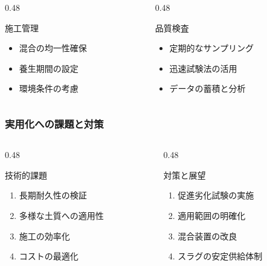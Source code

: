 \documentclass[unicode, 9pt, aspectratio=43]{beamer}
\begin{document}
\begin{refsection}
\begin{frame}
    \begin{columns}
      \begin{column}{0.48\linewidth}
        \begin{alertblock}{施工管理}
          \begin{itemize}
            \item 混合の均一性確保
            \item 養生期間の設定
            \item 環境条件の考慮
          \end{itemize}
        \end{alertblock}
      \end{column}
      \begin{column}{0.48\linewidth}
        \begin{exampleblock}{品質検査}
          \begin{itemize}
            \item 定期的なサンプリング
            \item 迅速試験法の活用
            \item データの蓄積と分析
          \end{itemize}
        \end{exampleblock}
      \end{column}
    \end{columns}
  \end{frame}

  \begin{frame}
    \frametitle{実用化への課題と対策}
    \begin{columns}
      \begin{column}{0.48\linewidth}
        \begin{alertblock}{技術的課題}
          \begin{enumerate}
            \item 長期耐久性の検証
            \item 多様な土質への適用性
            \item 施工の効率化
            \item コストの最適化
          \end{enumerate}
        \end{alertblock}
      \end{column}

      \begin{column}{0.48\linewidth}
        \begin{exampleblock}{対策と展望}
          \begin{enumerate}
            \item 促進劣化試験の実施
            \item 適用範囲の明確化
            \item 混合装置の改良
            \item スラグの安定供給体制
          \end{enumerate}
        \end{exampleblock}
      \end{column}
    \end{columns}


\end{frame}
\end{refsection}
\end{document}
